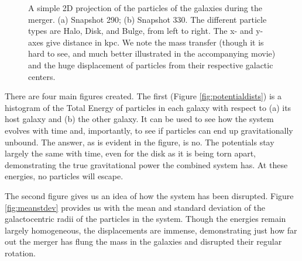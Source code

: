 \documentclass[linenumbers]{aastex631} %
\begin{document}
\begin{figure}[ht!]
\centering
      
      
\caption{\label{fig:2dproj} A simple 2D projection of the particles of the galaxies during the merger. (a) Snapshot 290; (b) Snapshot 330. The different particle types are Halo, Disk, and Bulge, from left to right. The x- and y-axes give distance in kpc. We note the mass transfer (though it is hard to see, and much better illustrated in the accompanying movie) and the huge displacement of particles from their respective galactic centers.}
\end{figure}

There are four main figures created. The first (Figure \ref{fig:potentialdists}) is a histogram of the Total Energy of particles in each galaxy with respect to (a) its host galaxy and (b) the other galaxy. It can be used to see how the system evolves with time and, importantly, to see if particles can end up gravitationally unbound. The answer, as is evident in the figure, is no. The potentials stay largely the same with time, even for the disk as it is being torn apart, demonstrating the true gravitational power the combined system has. At these energies, no particles will escape.

The second figure gives us an idea of how the system has been disrupted. Figure \ref{fig:meanstdev} provides us with the mean and standard deviation of the galactocentric radii of the particles in the system. Though the energies remain largely homogeneous, the displacements are immense, demonstrating just how far out the merger has flung the mass in the galaxies and disrupted their regular rotation.
\end{document}
